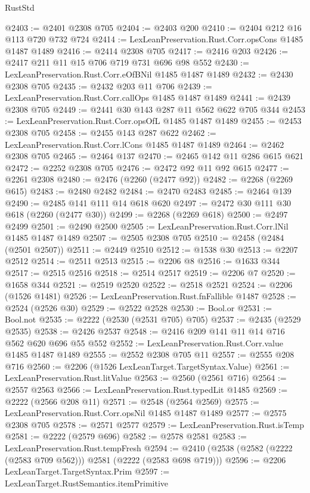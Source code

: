 \begin{lexlean}{RustStd}
\begin{coremodule}
@2403 := @2401 @2308 @705
@2404 := @2403 @200
@2410 := @2404 @212 @16 @113 @720 @732 @724
@2414 := LexLeanPreservation.Rust.Corr.opsCons @1485 @1487 @1489
@2416 := @2414 @2308 @705
@2417 := @2416 @203
@2426 := @2417 @211 @11 @15 @706 @719 @731 @696 @98 @552
@2430 := LexLeanPreservation.Rust.Corr.eOfBNil @1485 @1487 @1489
@2432 := @2430 @2308 @705
@2435 := @2432 @203 @11 @706
@2439 := LexLeanPreservation.Rust.Corr.callOps @1485 @1487 @1489
@2441 := @2439 @2308 @705
@2449 := @2441 @30 @143 @287 @11 @562 @622 @705 @344
@2453 := LexLeanPreservation.Rust.Corr.opsOfL @1485 @1487 @1489
@2455 := @2453 @2308 @705
@2458 := @2455 @143 @287 @622
@2462 := LexLeanPreservation.Rust.Corr.lCons @1485 @1487 @1489
@2464 := @2462 @2308 @705
@2465 := @2464 @137
@2470 := @2465 @142 @11 @286 @615 @621
@2472 := @2252 @2308 @705
@2476 := @2472 @92 @11 @92 @615
@2477 := @2261 @2308
@2480 := @2476 (@2260 (@2477 @92))
@2482 := @2268 (@2269 @615)
@2483 := @2480 @2482
@2484 := @2470 @2483
@2485 := @2464 @139
@2490 := @2485 @141 @111 @14 @618 @620
@2497 := @2472 @30 @111 @30 @618 (@2260 (@2477 @30))
@2499 := @2268 (@2269 @618)
@2500 := @2497 @2499
@2501 := @2490 @2500
@2505 := LexLeanPreservation.Rust.Corr.lNil @1485 @1487 @1489
@2507 := @2505 @2308 @705
@2510 := @2458 (@2484 (@2501 @2507))
@2511 := @2449 @2510
@2512 := @1538 @30
@2513 := @2207 @2512
@2514 := @2511 @2513
@2515 := @2206 @8
@2516 := @1633 @344
@2517 := @2515 @2516
@2518 := @2514 @2517
@2519 := @2206 @7
@2520 := @1658 @344
@2521 := @2519 @2520
@2522 := @2518 @2521
@2524 := @2206 (@1526 @1481)
@2526 := LexLeanPreservation.Rust.fnFallible @1487
@2528 := @2524 (@2526 @30)
@2529 := @2522 @2528
@2530 := Bool.or
@2531 := Bool.not
@2535 := @2222 (@2530 (@2531 @705) @705)
@2537 := @2435 (@2529 @2535)
@2538 := @2426 @2537
@2548 := @2416 @209 @141 @11 @14 @716 @562 @620 @696 @55 @552
@2552 := LexLeanPreservation.Rust.Corr.value @1485 @1487 @1489
@2555 := @2552 @2308 @705 @11
@2557 := @2555 @208 @716
@2560 := @2206 (@1526 LexLeanTarget.TargetSyntax.Value)
@2561 := LexLeanPreservation.Rust.litValue
@2563 := @2560 (@2561 @716)
@2564 := @2557 @2563
@2566 := LexLeanPreservation.Rust.typedLit @1485
@2569 := @2222 (@2566 @208 @11)
@2571 := @2548 (@2564 @2569)
@2575 := LexLeanPreservation.Rust.Corr.opsNil @1485 @1487 @1489
@2577 := @2575 @2308 @705
@2578 := @2571 @2577
@2579 := LexLeanPreservation.Rust.isTemp
@2581 := @2222 (@2579 @696)
@2582 := @2578 @2581
@2583 := LexLeanPreservation.Rust.tempFresh
@2594 := @2410 (@2538 (@2582 (@2222 (@2583 @709 @562))) @2581 (@2222 (@2583 @698 @719)))
@2596 := @2206 LexLeanTarget.TargetSyntax.Prim
@2597 := LexLeanTarget.RustSemantics.itemPrimitive

\end{coremodule}
\end{lexlean}
